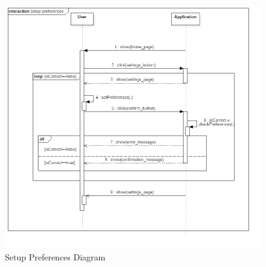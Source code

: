 \clearpage
\begin{figure}[!h]
\centering
\includegraphics[scale=0.6]{images/SetupPreferencesDiagram}
\caption{Setup Preferences Diagram}
\label{ref:setupprefencesdiagram}
\end{figure}